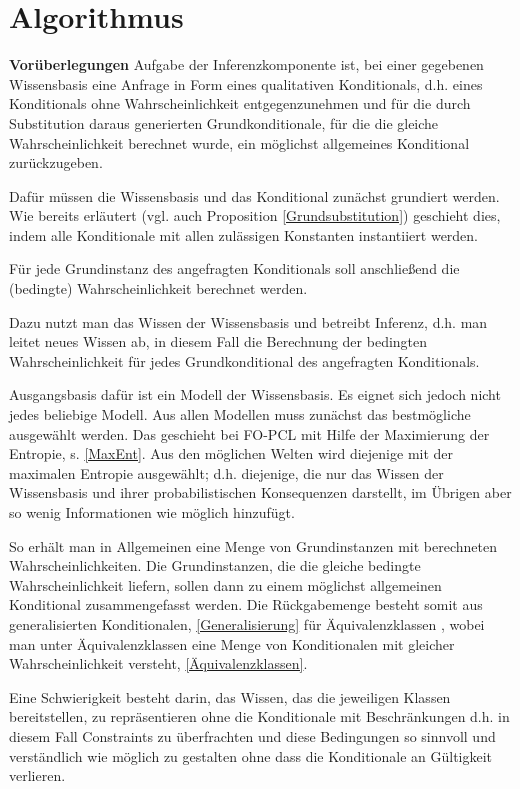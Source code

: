 \documentclass[draft]{scrreprt}
\begin{document}
\chapter{Algorithmus} \label{Alg}

\textbf{Vorüberlegungen}
Aufgabe der Inferenzkomponente ist, bei einer gegebenen Wissensbasis eine Anfrage in Form eines qualitativen Konditionals, d.h. eines Konditionals ohne Wahrscheinlichkeit entgegenzunehmen und für die durch Substitution daraus generierten Grundkonditionale, für die die gleiche Wahrscheinlichkeit berechnet wurde, ein möglichst allgemeines Konditional zurückzugeben.

Dafür müssen die Wissensbasis und das Konditional zunächst grundiert werden. Wie bereits erläutert (vgl. auch Proposition \ref{Grundsubstitution}) geschieht dies, indem alle Konditionale mit allen zulässigen Konstanten instantiiert werden.

Für jede Grundinstanz des angefragten Konditionals soll anschließend die (bedingte) Wahrscheinlichkeit berechnet werden.

Dazu nutzt man das Wissen der Wissensbasis und betreibt Inferenz, d.h. man leitet neues Wissen ab,  in diesem Fall die Berechnung der bedingten Wahrscheinlichkeit für jedes Grundkonditional des angefragten Konditionals.

Ausgangsbasis dafür ist ein Modell der Wissensbasis. Es eignet sich jedoch nicht jedes beliebige Modell. Aus allen Modellen muss zunächst das bestmögliche ausgewählt werden.
Das geschieht bei FO-PCL mit Hilfe der Maximierung der Entropie, s. \ref{MaxEnt}. Aus den möglichen Welten wird diejenige mit der maximalen Entropie ausgewählt; d.h. diejenige, die nur das Wissen der Wissensbasis und ihrer probabilistischen Konsequenzen darstellt, im Übrigen aber so wenig Informationen wie möglich hinzufügt.

So erhält man in Allgemeinen eine Menge von Grundinstanzen mit berechneten Wahrscheinlichkeiten.
Die Grundinstanzen, die die gleiche bedingte Wahrscheinlichkeit liefern, sollen dann zu einem möglichst allgemeinen Konditional zusammengefasst werden. Die Rückgabemenge besteht somit aus generalisierten Konditionalen, \ref{Generalisierung} für Äquivalenzklassen  , wobei man unter Äquivalenzklassen eine Menge von Konditionalen mit gleicher Wahrscheinlichkeit versteht, \ref{Äquivalenzklassen}. 

Eine Schwierigkeit besteht darin, das Wissen, das die jeweiligen Klassen bereitstellen, zu repräsentieren ohne die Konditionale mit Beschränkungen d.h. in diesem Fall Constraints zu überfrachten und diese Bedingungen so sinnvoll und verständlich wie möglich zu gestalten ohne dass die Konditionale an Gültigkeit verlieren.
\end{document}
